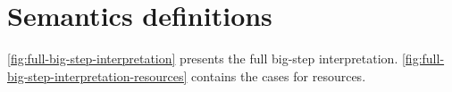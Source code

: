 \section{Semantics definitions}
\label{sec:semant-defin}

% 




\cref{fig:full-big-step-interpretation} presents  the full big-step
interpretation. \cref{fig:full-big-step-interpretation-resources}
contains the cases for resources.


